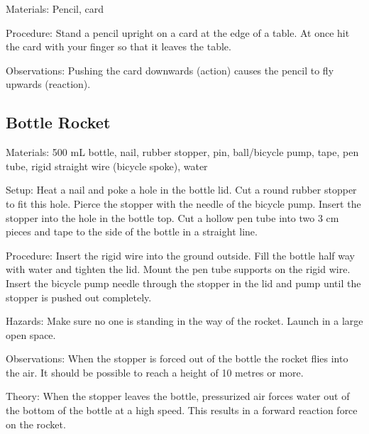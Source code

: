 \begin{multicols}{2}
\begin{description*}
\item[Materials:]{Pencil, card}
\item[Procedure:]{Stand a pencil upright on a card at the edge of a table. At once hit the card with your finger so that it leaves the table.}
\item[Observations:]{Pushing the card downwards (action) causes the pencil to fly upwards (reaction).}
\end{description*}

\subsection{Bottle Rocket}


\begin{description*}
\item[Materials:]{500 mL bottle, nail, rubber stopper, pin, ball/bicycle pump, tape, pen tube, rigid straight wire (bicycle spoke), water}
\item[Setup:]{Heat a nail and poke a hole in the bottle lid. Cut a round rubber stopper to fit this hole. Pierce the stopper with the needle of the bicycle pump. Insert the stopper into the hole in the bottle top. Cut a hollow pen tube into two 3 cm pieces and tape to the side of the bottle in a straight line.}
\item[Procedure:]{Insert the rigid wire into the ground outside. Fill the bottle half way with water and tighten the lid. Mount the pen tube supports on the rigid wire. Insert the bicycle pump needle through the stopper in the lid and pump until the stopper is pushed out completely.}
\item[Hazards:]{Make sure no one is standing in the way of the rocket. Launch in a large open space.}
\item[Observations:]{When the stopper is forced out of the bottle the rocket flies into the air. It should be possible to reach a height of 10 metres or more.}
\item[Theory:]{When the stopper leaves the bottle, pressurized air forces water out of the bottom of the bottle at a high speed. This results in a forward reaction force on the rocket.}
\end{description*}


\end{multicols}

